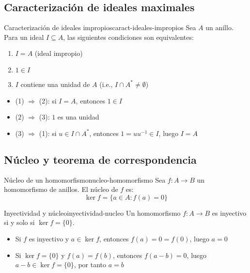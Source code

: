 \subsection{Caracterización de ideales maximales}

\begin{lemma}{Caracterización de ideales impropios}{caract-ideales-impropios}
    Sea \(A\) un anillo. Para un ideal \(I \subseteq A\), las siguientes condiciones son equivalentes:
    \begin{enumerate}
        \item \(I = A\) (ideal impropio)
        \item \(1 \in I\)
        \item \(I\) contiene una unidad de \(A\) (i.e., \(I \cap A^* \neq \emptyset\))
    \end{enumerate}
\end{lemma}

\begin{proofbox}
    \begin{itemize}
        \item (1) \(\Rightarrow\) (2): si \(I = A\), entonces \(1 \in I\)
        \item (2) \(\Rightarrow\) (3): \(1\) es una unidad
        \item (3) \(\Rightarrow\) (1): si \(u \in I \cap A^*\), entonces \(1 = uu^{-1} \in I\), luego \(I = A\)
    \end{itemize}
\end{proofbox}

\subsection{Núcleo y teorema de correspondencia}

\begin{definition}{Núcleo de un homomorfismo}{nucleo-homomorfismo}
    Sea \(f: A \to B\) un homomorfismo de anillos. El {núcleo} de \(f\) es:
    \[
    \ker f = \{a \in A : f(a) = 0\}
    \]
\end{definition}

\begin{proposition}{Inyectividad y núcleo}{inyectividad-nucleo}
    Un homomorfismo \(f: A \to B\) es inyectivo si y solo si \(\ker f = \{0\}\).
\end{proposition}

\begin{proofbox}
    \begin{itemize}
        \item Si \(f\) es inyectivo y \(a \in \ker f\), entonces \(f(a) = 0 = f(0)\), luego \(a = 0\)
        \item Si \(\ker f = \{0\}\) y \(f(a) = f(b)\), entonces \(f(a - b) = 0\), luego \(a - b \in \ker f = \{0\}\), por tanto \(a = b\)
    \end{itemize}
\end{proofbox}

